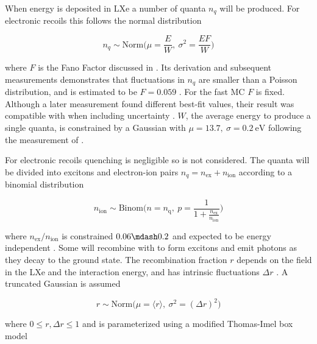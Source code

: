 When energy is deposited in LXe a number of quanta $n_q$ will be produced.  For electronic recoils this follows the normal distribution

\begin{equation}
n_q \sim \mathrm{Norm} \bigg( \mu = \frac{E}{W},\ \sigma^2 = \frac{E F}{W} \bigg)
\label{eq:er_nr_calibrations_parameter_determ_er_quanta}
\end{equation}

\noindent where $F$ is the Fano Factor  discussed in .  Its derivation and subsequent measurements
demonstrates that fluctuations in $n_q$ are smaller than a Poisson distribution, and is estimated to be $F = 0.059$
.  For the
fast MC $F$ is fixed.  Although a later measurement found different best-fit values, their result was
compatible with  when including uncertainty .  $W$, the average energy to produce a single
quanta, is constrained by a Gaussian with $\mu = 13.7,\ \sigma = 0.2\ \mathrm{eV}$ following the measurement of .

For electronic recoils quenching is negligible so is not considered.  The quanta will be divided into excitons and electron-ion pairs
$n_q = n_{\mathrm{ex}} + n_{\mathrm{ion}}$ according to a binomial distribution

\begin{equation}
n_{\mathrm{ion}} \sim \mathrm{Binom} \Bigg(n = n_{\mathrm{q}},\ p = \frac{1}{1 + \frac{n_{\mathrm{ex}}}{n_{\mathrm{ion}}}} \Bigg)
\label{eq:er_nr_calibrations_parameter_determ_er_nions}
\end{equation}

\noindent where $n_{\mathrm{ex}} / n_{\mathrm{ion}}$ is constrained $0.06 \mdash 0.2$ and expected to be energy independent
.  Some \electron will recombine with  to form
excitons and emit photons as they decay to the ground state.  The recombination fraction $r$ depends on the field in the LXe and the
interaction energy, and has intrinsic fluctuations $\Delta r$ .  A truncated Gaussian is assumed

\begin{equation}
r \sim \mathrm{Norm} \Big( \mu = \langle r \rangle,\ \sigma^2 = (\Delta r)^2 \Big)
\end{equation}

\noindent where $0 \leq r, \Delta r \leq 1$ and is parameterized using a modified Thomas-Imel box model 


